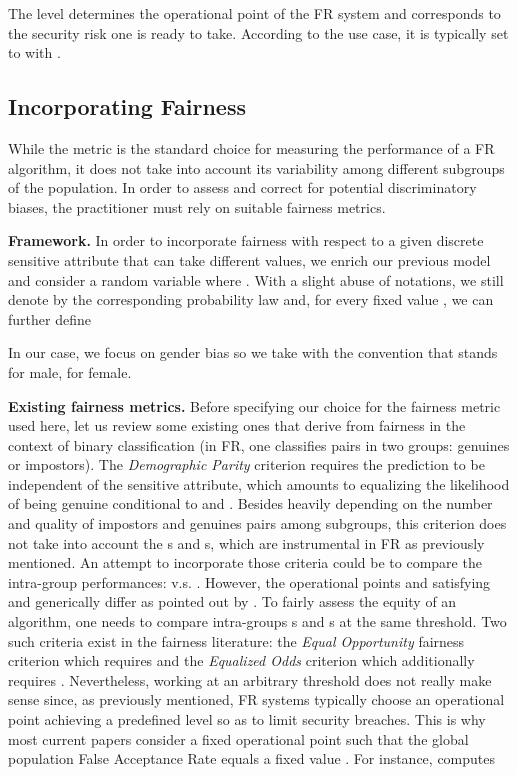 \documentclass[nohyperref]{article}
\theoremstyle{plain}
\theoremstyle{definition}
\theoremstyle{remark}
\begin{document}
The  level  determines the operational point of the FR system and corresponds to the security risk one is ready to take. According to the use case, it is typically set to  with .

\subsection{Incorporating Fairness}\label{subsec:fairness}
While the  metric is the standard choice for measuring the performance of a FR algorithm, it does not take into account its variability among different subgroups of the population. In order to assess and correct for potential discriminatory biases, the practitioner must rely on suitable fairness metrics. 

{\bf Framework.} In order to incorporate fairness with respect to a given discrete sensitive attribute that can take  different values, we enrich our previous model and consider a random variable  where . With a slight abuse of notations, we still denote by  the corresponding probability law and, for every fixed value , we can further define

In our case, we focus on gender bias so we take  with the convention that  stands for male,  for female. 

{\bf Existing fairness metrics.} Before specifying our choice for the fairness metric used here, let us review some existing ones \cite{survey_fairness_ML} that derive from fairness in the context of binary classification (in FR, one classifies pairs in two groups: genuines or impostors). 
The {\it Demographic Parity} criterion requires the prediction to be independent of the sensitive attribute, which amounts to equalizing the likelihood of being genuine conditional to  and . Besides heavily depending on the number and quality of impostors and genuines pairs among subgroups, this criterion does not take into account the s and s, which are instrumental in FR as previously mentioned. An attempt to incorporate those criteria could be to compare the intra-group performances:  v.s. . However, the operational points  and  satisfying  and  generically differ as pointed out by \cite{issues_race_bias}. To fairly assess the equity of an algorithm, one needs to compare intra-groups s and s at the same threshold. Two such criteria exist in the fairness literature: the {\it Equal Opportunity} fairness criterion which requires  and the {\it Equalized Odds} criterion which additionally requires . Nevertheless, working at an arbitrary threshold  does not really make sense since, as previously mentioned, FR systems typically choose an operational point achieving a predefined  level so as to limit security breaches. This is why most current papers consider a fixed operational point  such that the global population False Acceptance Rate equals a fixed value . For instance, \cite{dhar2021pass} computes
\end{document}
